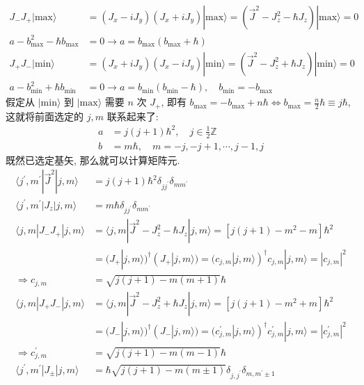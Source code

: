 \documentclass[../../main.tex]{subfiles}
\begin{document}
\begin{align*}
    J_{-}J_{+}|\text{max}\rangle &= (J_{x}-iJ_{y})(J_{x} + iJ_{y})|\text{max}\rangle = (\vec{J}^{2} - J_{z}^{2} - \hbar J_{z})|\text{max}\rangle = 0\\
    a - b_{\text{max}}^{2} - \hbar b_{\text{max}} &= 0\rightarrow a = b_{\text{max}}(b_{\text{max}} + \hbar)\\
    J_{+}J_{-}|\text{min}\rangle &= (J_{x}+iJ_{y})(J_{x} - iJ_{y})|\text{min}\rangle = (\vec{J}^{2} - J_{z}^{2} + \hbar J_{z})|\text{min}\rangle = 0\\
    a - b_{\text{min}}^{2} + \hbar b_{\text{min}} &= 0\rightarrow a = b_{\text{min}}(b_{\text{min}} - \hbar),\quad b_{\text{min}} = -b_{\text{max}}
\end{align*}
假定从 $|\text{min}\rangle$ 到 $|\text{max}\rangle$ 需要 $n$ 次 $J_{+}$, 即有 $b_{\max} = -b_{\max} + n\hbar\iff b_{\text{max}} = \frac{n}{2}\hbar\equiv j\hbar$, 这就将前面选定的 $j,m$ 联系起来了:
\begin{align*}
    a &= j(j+1)\hbar^{2},\quad j\in\frac{1}{2}\mathbb{Z}\\
    b &= m\hbar, \quad m = -j,-j+1,\cdots,j-1,j
\end{align*}
既然已选定基矢, 那么就可以计算矩阵元. 
\begin{align*}
    \langle j^{\prime},m^{\prime}|\vec{J}^{2}|j,m\rangle &= j(j+1)\hbar^{2}\delta_{jj^{\prime}}\delta_{mm^{\prime}}\\
    \langle j^{\prime},m^{\prime}|J_{z}|j,m\rangle &= m\hbar\delta_{jj^{\prime}}\delta_{mm^{\prime}}\\
    \langle j,m|J_{-}J_{+}|j,m\rangle &= \langle j,m|\vec{J}^{2} - J_{z}^{2} - \hbar J_{z}|j,m\rangle = [j(j+1) - m^{2} - m]\hbar^{2}\\
    &= (J_{+}|j,m\rangle)^{\dagger}(J_{+}|j,m\rangle) = (c_{j,m}|j,m\rangle)^{\dagger}c_{j,m}|j,m\rangle = |c_{j,m}|^{2}\\
    \Rightarrow c_{j,m} &= \sqrt{j(j+1)-m(m+1)}\hbar\\
    \langle j,m|J_{+}J_{-}|j,m\rangle &= \langle j,m|\vec{J}^{2} - J_{z}^{2} + \hbar J_{z}|j,m\rangle = [j(j+1) - m^{2} + m]\hbar^{2}\\
    &= (J_{-}|j,m\rangle)^{\dagger}(J_{-}|j,m\rangle) = (c_{j,m}^{\prime}|j,m\rangle)^{\dagger}c_{j,m}^{\prime}|j,m\rangle = |c_{j,m}^{\prime}|^{2}\\
    \Rightarrow c_{j,m}^{\prime} &= \sqrt{j(j+1)-m(m-1)}\hbar\\
    \langle j^{\prime},m^{\prime}|J_{\pm}|j,m\rangle &= \hbar\sqrt{j(j+1) - m(m\pm 1)}\delta_{j,j^{\prime}}\delta_{m,m^{\prime}\pm 1}
\end{align*}
\end{document}
